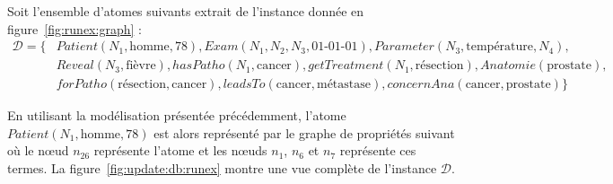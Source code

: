 \begin{example}
    Soit l'ensemble d'atomes suivants extrait de l'instance donnée en figure~\ref{fig:runex:graph} :
    \begin{align*}
        \mathcal{D} = \{ & Patient(N_1, \text{homme}, 78), Exam(N_1, N_2, N_3, \text{01-01-01}), Parameter(N_3, \text{température}, N_4), \\
                        & Reveal(N_3, \text{fièvre}), hasPatho(N_1, \text{cancer}), getTreatment(N_1, \text{résection}), Anatomie(\text{prostate}), \\
                        & forPatho(\text{résection}, \text{cancer}), leadsTo(\text{cancer}, \text{métastase}), concernAna(\text{cancer}, \text{prostate}) \}
    \end{align*}

    En utilisant la modélisation présentée précédemment, l'atome $Patient(N_1, \text{homme}, 78)$ est alors représenté par le graphe de propriétés suivant où le nœud $n_26$ représente l'atome et les nœuds $n_1$, $n_6$ et $n_7$ représente ces termes.
    La figure~\ref{fig:update:db:runex} montre une vue complète de l'instance $\mathcal{D}$.

    \begin{center}
    \end{center}
\end{example}

